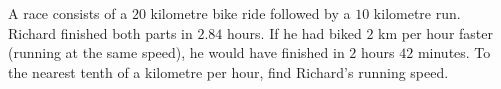 A race consists of a $20$ kilometre bike ride followed by a $10$ kilometre run. Richard finished both parts in $2.84$ hours. If he had biked $2$ km per hour faster (running at the same speed), he would have finished in $2$ hours $42$ minutes. To the nearest tenth of a kilometre per hour, find Richard's running speed.
